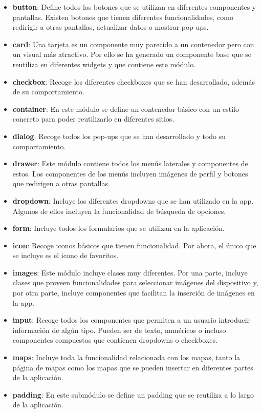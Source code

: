 \documentclass[a4paper, 12pt]{article}
\begin{document}
\begin{itemize}[noitemsep]
	\item \textbf{button}: Define todos los botones que se utilizan en diferentes componentes y pantallas. Existen botones que tienen diferentes funcionalidades, como redirigir a otras pantallas, actualizar datos o mostrar pop-ups.
	\item \textbf{card}: Una tarjeta es un componente muy parecido a un contenedor pero con un visual más atractivo. Por ello se ha generado un componente base que se reutiliza en diferentes widgets y que contiene este módulo.
	\item \textbf{checkbox}: Recoge los diferentes checkboxes que se han desarrollado, además de su comportamiento.
	\item \textbf{container}: En este módulo se define un contenedor básico con un estilo concreto para poder reutilizarlo en diferentes sitios.
	\item \textbf{dialog}: Recoge todos los pop-ups que se han desarrollado y todo su comportamiento.
	\item \textbf{drawer}: Este módulo contiene todos los menús laterales y componentes de estos. Los componentes de los menús incluyen imágenes de perfil y botones que redirigen a otras pantallas.
	\item \textbf{dropdown}: Incluye los diferentes dropdowns que se han utilizado en la app. Algunos de ellos incluyen la funcionalidad de búsqueda de opciones.
	\item \textbf{form}: Incluye todos los formularios que se utilizan en la aplicación.
	\item \textbf{icon}: Recoge iconos básicos que tienen funcionalidad. Por ahora, el único que se incluye es el icono de favoritos.
	\item \textbf{images}: Este módulo incluye clases muy diferentes. Por una parte, incluye clases que proveen funcionalidades para seleccionar imágenes del dispositivo y, por otra parte, incluye componentes que facilitan la inserción de imágenes en la app.
	\item \textbf{input}: Recoge todos los componentes que permiten a un usuario introducir información de algún tipo. Pueden ser de texto, numéricos o incluso componentes compuestos que contienen dropdowns o checkboxes.
	\item \textbf{maps}: Incluye toda la funcionalidad relacionada con los mapas, tanto la página de mapas como los mapas que se pueden insertar en diferentes partes de la aplicación.
	\item \textbf{padding}: En este submódulo se define un padding que se reutiliza a lo largo de la aplicación.

\end{itemize}
\end{document}
